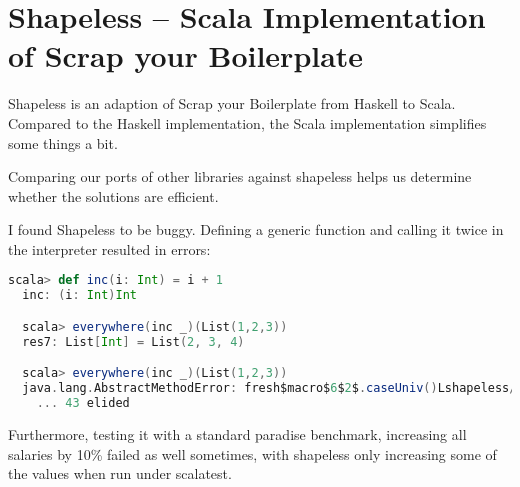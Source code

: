 \section{Shapeless -- Scala Implementation of Scrap your Boilerplate}

Shapeless is an adaption of Scrap your Boilerplate\cite{DBLP:conf/tldi/LammelJ03}
from Haskell to Scala. Compared to the Haskell implementation, the Scala
implementation simplifies some things a bit.

Comparing our ports of other libraries against shapeless helps us determine
whether the solutions are efficient.

I found Shapeless to be buggy. Defining a generic function and calling
it twice in the interpreter resulted in errors:
\begin{lstlisting}[language=Scala,gobble=6]
  scala> def inc(i: Int) = i + 1
  inc: (i: Int)Int

  scala> everywhere(inc _)(List(1,2,3))
  res7: List[Int] = List(2, 3, 4)

  scala> everywhere(inc _)(List(1,2,3))
  java.lang.AbstractMethodError: fresh$macro$6$2$.caseUniv()Lshapeless/PolyDefns$Case;
    ... 43 elided
\end{lstlisting}

Furthermore, testing it with a standard paradise benchmark, increasing all
salaries by 10\% failed as well sometimes, with shapeless only increasing
some of the values when run under scalatest.
